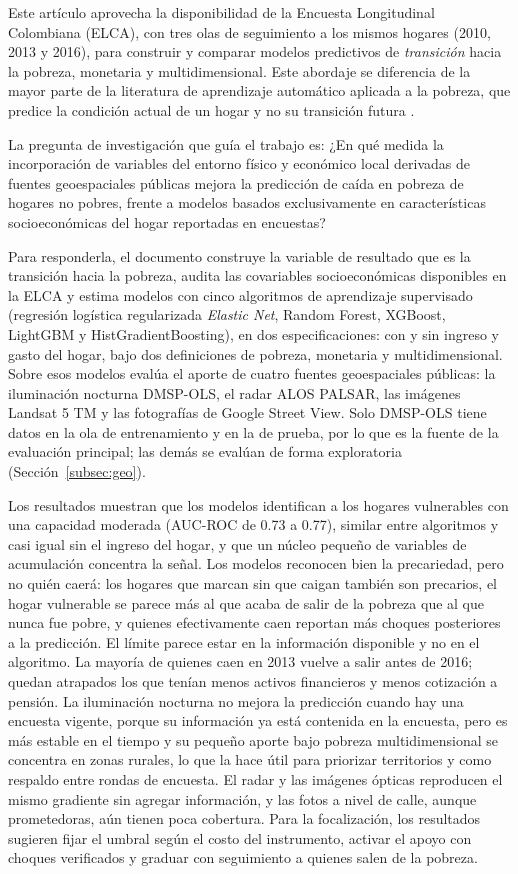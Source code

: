 \documentclass[12pt, letterpaper]{article}
\begin{document}
Este artículo aprovecha la disponibilidad de la Encuesta Longitudinal
Colombiana (ELCA), con tres olas de seguimiento a los mismos
hogares (2010, 2013 y 2016), para construir y comparar modelos
predictivos de \emph{transición} hacia la pobreza, monetaria y
multidimensional. Este abordaje se diferencia de la mayor parte de la
literatura de aprendizaje automático aplicada a la pobreza, que predice
la condición actual de un hogar y no su transición futura
\parencite{muneton2022,ferdausi2025}.

La pregunta de investigación que guía el trabajo es: 
¿En qué medida la incorporación de variables del
entorno físico y económico local derivadas de fuentes geoespaciales
públicas mejora la predicción de caída en pobreza de
hogares no pobres, frente a modelos basados exclusivamente en
características socioeconómicas del hogar reportadas en encuestas?

Para responderla, el documento construye la variable de resultado 
que es la transición hacia la pobreza,
audita las covariables socioeconómicas disponibles en la ELCA 
y estima modelos con cinco algoritmos de aprendizaje supervisado
(regresión logística regularizada \emph{Elastic Net}, Random Forest, XGBoost, LightGBM y
HistGradientBoosting), en dos especificaciones: con y sin ingreso y gasto del hogar, bajo dos
definiciones de pobreza, monetaria y multidimensional. Sobre esos modelos
evalúa el aporte de cuatro fuentes geoespaciales públicas: la iluminación
nocturna DMSP-OLS, el radar ALOS PALSAR, las imágenes Landsat 5 TM y las
fotografías de Google Street View. Solo DMSP-OLS tiene datos en la ola de
entrenamiento y en la de prueba, por lo que es la fuente de la evaluación
principal; las demás se evalúan de forma exploratoria
(Sección~\ref{subsec:geo}).

Los resultados muestran que los modelos identifican a los hogares
vulnerables con una capacidad moderada (AUC-ROC de 0.73 a 0.77), similar
entre algoritmos y casi igual sin el ingreso del hogar, y que un núcleo
pequeño de variables de acumulación concentra la señal. Los modelos
reconocen bien la precariedad, pero no quién caerá: los hogares que marcan
sin que caigan también son precarios, el hogar vulnerable se parece más al
que acaba de salir de la pobreza que al que nunca fue pobre, y quienes
efectivamente caen reportan más choques posteriores a la predicción. El
límite parece estar en la información disponible y no en el algoritmo. La
mayoría de quienes caen en 2013 vuelve a salir antes de 2016; quedan
atrapados los que tenían menos activos financieros y menos cotización a
pensión. La iluminación nocturna no mejora la predicción cuando hay una
encuesta vigente, porque su información ya está contenida en la encuesta,
pero es más estable en el tiempo y su pequeño aporte bajo pobreza
multidimensional se concentra en zonas rurales, lo que la hace útil para
priorizar territorios y como respaldo entre rondas de encuesta. El radar
y las imágenes ópticas reproducen el mismo gradiente sin agregar
información, y las fotos a nivel de calle, aunque prometedoras, aún tienen
poca cobertura. Para la focalización, los resultados sugieren fijar el
umbral según el costo del instrumento, activar el apoyo con choques
verificados y graduar con seguimiento a quienes salen de la pobreza.
\end{document}

